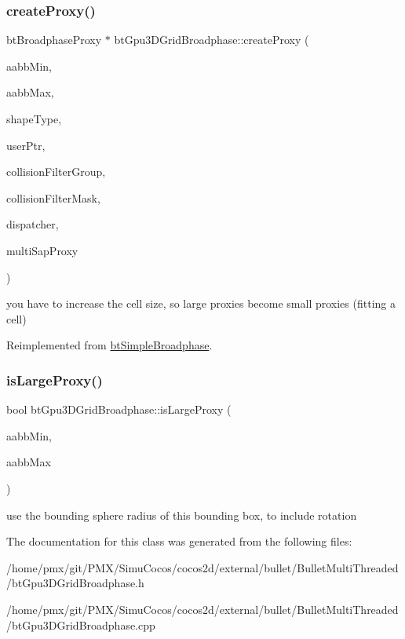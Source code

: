 \subsubsection{\texorpdfstring{create\+Proxy()}{createProxy()}}
{\footnotesize\ttfamily bt\+Broadphase\+Proxy $\ast$ bt\+Gpu3\+D\+Grid\+Broadphase\+::create\+Proxy (\begin{DoxyParamCaption}\item[{const bt\+Vector3 \&}]{aabb\+Min,  }\item[{const bt\+Vector3 \&}]{aabb\+Max,  }\item[{int}]{shape\+Type,  }\item[{void $\ast$}]{user\+Ptr,  }\item[{short int}]{collision\+Filter\+Group,  }\item[{short int}]{collision\+Filter\+Mask,  }\item[{\hyperlink{classbtDispatcher}{bt\+Dispatcher} $\ast$}]{dispatcher,  }\item[{void $\ast$}]{multi\+Sap\+Proxy }\end{DoxyParamCaption})\hspace{0.3cm}{\ttfamily [virtual]}}

you have to increase the cell size, so \textquotesingle{}large\textquotesingle{} proxies become \textquotesingle{}small\textquotesingle{} proxies (fitting a cell) 

Reimplemented from \hyperlink{classbtSimpleBroadphase}{bt\+Simple\+Broadphase}.

\mbox{\label{classbtGpu3DGridBroadphase_a131cfab867b25116adb72d79435be34d}} 
\subsubsection{\texorpdfstring{is\+Large\+Proxy()}{isLargeProxy()}}
{\footnotesize\ttfamily bool bt\+Gpu3\+D\+Grid\+Broadphase\+::is\+Large\+Proxy (\begin{DoxyParamCaption}\item[{const bt\+Vector3 \&}]{aabb\+Min,  }\item[{const bt\+Vector3 \&}]{aabb\+Max }\end{DoxyParamCaption})\hspace{0.3cm}{\ttfamily [protected]}}

use the bounding sphere radius of this bounding box, to include rotation 

The documentation for this class was generated from the following files\+:\begin{DoxyCompactItemize}
\item 
/home/pmx/git/\+P\+M\+X/\+Simu\+Cocos/cocos2d/external/bullet/\+Bullet\+Multi\+Threaded/bt\+Gpu3\+D\+Grid\+Broadphase.\+h\item 
/home/pmx/git/\+P\+M\+X/\+Simu\+Cocos/cocos2d/external/bullet/\+Bullet\+Multi\+Threaded/bt\+Gpu3\+D\+Grid\+Broadphase.\+cpp\end{DoxyCompactItemize}
